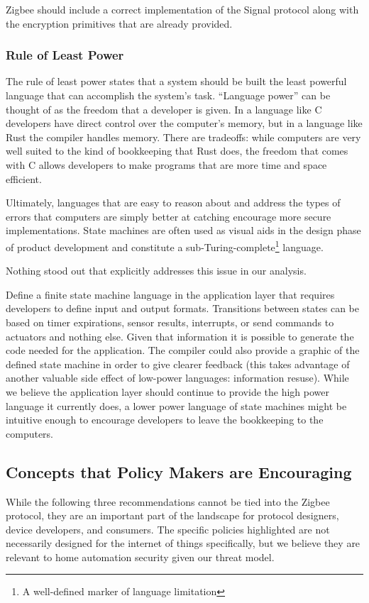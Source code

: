  Zigbee should include a correct implementation of the Signal protocol along with the encryption primitives that are already provided.

\subsubsection{Rule of Least Power}
The rule of least power states that a system should be built the least powerful language that can accomplish the system’s task. “Language power” can be thought of as the freedom that a developer is given. In a language like C developers have direct control over the computer’s memory, but in a language like Rust the compiler handles memory. There are tradeoffs: while computers are very well suited to the kind of bookkeeping that Rust does, the freedom that comes with C allows developers to make programs that are more time and space efficient.


 Ultimately, languages that are easy to reason about and address the types of errors that computers are simply better at catching encourage more secure implementations. State machines are often used as visual aids in the design phase of product development and constitute a sub-Turing-complete\footnote{A well-defined marker of language limitation} language.

 Nothing stood out that explicitly addresses this issue in our analysis.


 Define a finite state machine language in the application layer that requires developers to define input and output formats. Transitions between states can be based on timer expirations, sensor results, interrupts, or send commands to actuators and nothing else. Given that information it is possible to generate the code needed for the application. The compiler could also provide a graphic of the defined state machine in order to give clearer feedback (this takes advantage of another valuable side effect of low-power languages: information resuse). While we believe the application layer should continue to provide the high power language it currently does, a lower power language of state machines might be intuitive enough to encourage developers to leave the bookkeeping to the computers.


\subsection{Concepts that Policy Makers are Encouraging}
While the following three recommendations cannot be tied into the Zigbee protocol, they are an important part of the landscape for protocol designers, device developers, and consumers. The specific policies highlighted are not necessarily designed for the internet of things specifically, but we believe they are relevant to home automation security given our threat model.

